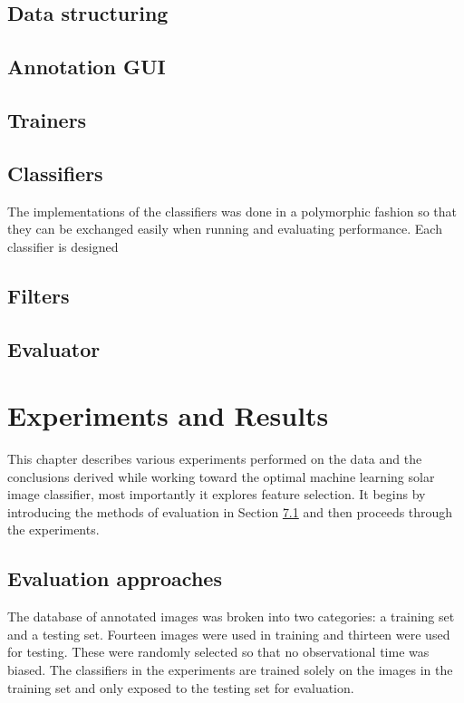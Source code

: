 \documentclass[twoside]{report}
\begin{document}
\section{Data structuring}

\section{Annotation GUI}

\section{Trainers}

\section{Classifiers}
The implementations of the classifiers was done in a polymorphic fashion so that they can be exchanged easily when running and evaluating performance. Each classifier is designed 

\section{Filters}

\section{Evaluator}



\chapter{Experiments and Results} \label{ch:experiments}

This chapter describes various experiments performed on the data and the conclusions derived while working toward the optimal machine learning solar image classifier, most importantly it explores feature selection. It begins by introducing the methods of evaluation in Section \ref{sec:evaluationmethods} and then proceeds through the experiments. 

\section{Evaluation approaches}\label{sec:evaluationmethods}
The database of annotated images was broken into two categories: a training set and a testing set. Fourteen images were used in training and thirteen were used for testing. These were randomly selected so that no observational time was biased. The classifiers in the experiments are trained solely on the images in the training set and only exposed to the testing set for evaluation. 
\end{document}
